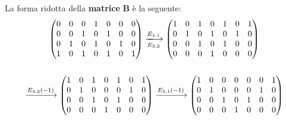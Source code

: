 \documentclass[a4paper]{article}
\makeatletter
\newenvironment{rowequmat}[1]{\left(\array{@{}#1@{}}}{\endarray\right)}
\makeatother
\begin{document}
	La forma ridotta della \textbf{matrice} $\boldsymbol{B}$ è la seguente:
	\begin{gather*}
		\begin{rowequmat}{ccccccc}
			0 & 0 & 0 & 1 & 0 & 0 & 0 \\
			0 & 0 & 1 & 0 & 1 & 0 & 0 \\
			0 & 1 & 0 & 1 & 0 & 1 & 0 \\
			1 & 0 & 1 & 0 & 1 & 0 & 1
		\end{rowequmat} \xlongrightarrow[E_{3,2}]{E_{4,1}}
		\begin{rowequmat}{ccccccc}
			1 & 0 & 1 & 0 & 1 & 0 & 1 \\
			0 & 1 & 0 & 1 & 0 & 1 & 0 \\
			0 & 0 & 1 & 0 & 1 & 0 & 0 \\
			0 & 0 & 0 & 1 & 0 & 0 & 0
		\end{rowequmat} \\
		\\
		\xlongrightarrow{E_{4,2}\left(-1\right)}
		\begin{rowequmat}{ccccccc}
			1 & 0 & 1 & 0 & 1 & 0 & 1 \\
			0 & 1 & 0 & 0 & 0 & 1 & 0 \\
			0 & 0 & 1 & 0 & 1 & 0 & 0 \\
			0 & 0 & 0 & 1 & 0 & 0 & 0
		\end{rowequmat} \xlongrightarrow{E_{3,1}\left(-1\right)}
		\begin{rowequmat}{ccccccc}
			1 & 0 & 0 & 0 & 0 & 0 & 1 \\
			0 & 1 & 0 & 0 & 0 & 1 & 0 \\
			0 & 0 & 1 & 0 & 1 & 0 & 0 \\
			0 & 0 & 0 & 1 & 0 & 0 & 0
		\end{rowequmat}
	\end{gather*}\newpage
	
\end{document}
